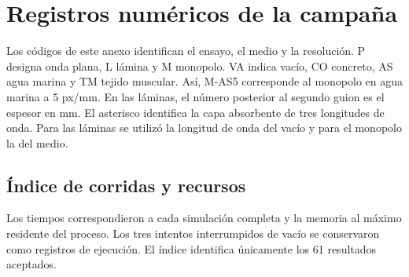 \chapter{Registros numéricos de la campaña}\label{an:fdtd-fuentes}
Los códigos de este anexo identifican el ensayo, el medio y la resolución. P designa onda plana, L lámina y M monopolo. VA indica vacío, CO concreto, AS agua marina y TM tejido muscular. Así, M-AS5 corresponde al monopolo en agua marina a 5 px/mm. En las láminas, el número posterior al segundo guion es el espesor en mm. El asterisco identifica la capa absorbente de tres longitudes de onda. Para las láminas se utilizó la longitud de onda del vacío y para el monopolo la del medio.
\section{Índice de corridas y recursos}
Los tiempos correspondieron a cada simulación completa y la memoria al máximo residente del proceso. Los tres intentos interrumpidos de vacío se conservaron como registros de ejecución. El índice identifica únicamente los 61 resultados aceptados.
\begingroup\small\setlength{\tabcolsep}{4pt}
